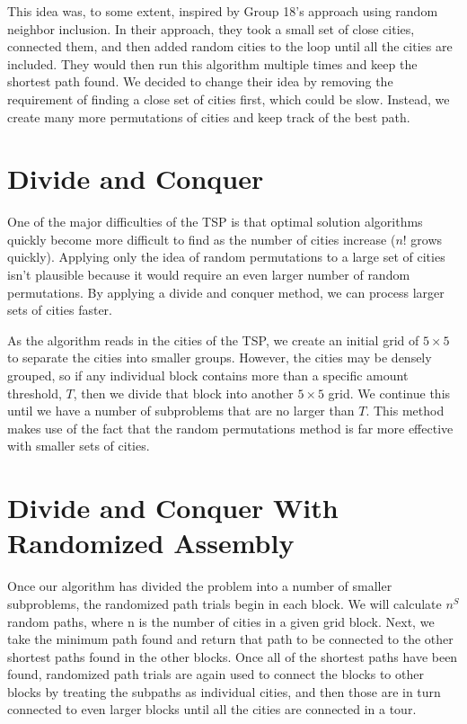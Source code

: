 \documentclass[12pt,letterpaper]{article}
\begin{document}
This idea was, to some extent, inspired by Group 18's approach using random neighbor inclusion. In their approach, they took a small set of close cities, connected them, and then added random cities to the loop until all the cities are included. They would then run this algorithm multiple times and keep the shortest path found. We decided to change their idea by removing the requirement of finding a close set of cities first, which could be slow. Instead, we create many more permutations of cities and keep track of the best path.

\section*{Divide and Conquer}

One of the major difficulties of the TSP is that optimal solution algorithms quickly become more difficult to find as the number of cities increase ($n!$ grows quickly). Applying only the idea of random permutations to a large set of cities isn't plausible because it would require an even larger number of random permutations. By applying a divide and conquer method, we can process larger sets of cities faster.

As the algorithm reads in the cities of the TSP, we create an initial grid of $5 \times 5$ to separate the cities into smaller groups. However, the cities may be densely grouped, so if any individual block contains more than a specific amount threshold, $T$, then we divide that block into another $5 \times 5$ grid. We continue this until we have a number of subproblems that are no larger than $T$. This method makes use of the fact that the random permutations method is far more effective with smaller sets of cities.

\section*{Divide and Conquer With Randomized Assembly}

Once our algorithm has divided the problem into a number of smaller subproblems, the randomized path trials begin in each block. We will calculate $n^S$ random paths, where n is the number of cities in a given grid block. Next, we take the minimum path found and return that path to be connected to the other shortest paths found in the other blocks. Once all of the shortest paths have been found, randomized path trials are again used to connect the blocks to other blocks by treating the subpaths as individual cities, and then those are in turn connected to even larger blocks until all the cities are connected in a tour.
\end{document}
